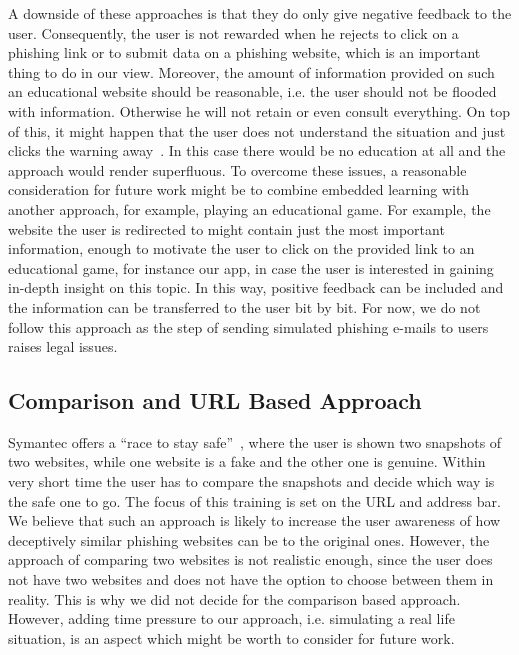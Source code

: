 A downside of these approaches is that they do only give negative feedback to the user. 
Consequently, the user is not rewarded when he rejects to click on a phishing link or to submit data on a phishing website, which is an important thing to do in our view. 
Moreover, the amount of information provided on such an educational website should be reasonable, i.e. the user should not be flooded with information. 
Otherwise he will not retain or even consult everything. 
On top of this, it might happen that the user does not understand the situation and just clicks the warning away~\cite{TUD-CS-2013-0167}.
In this case there would be no education at all and the approach would render superfluous.
To overcome these issues, a reasonable consideration for future work might be to combine embedded learning with another approach, for example, playing an educational game. 
For example, the website the user is redirected to might contain just the most important information, enough to motivate the user to click on the provided link to an educational game, for instance our app, in case the user is interested in gaining in-depth insight on this topic. 
In this way, positive feedback can be included and the information can be transferred to the user bit by bit. 
For now, we do not follow this approach as the step of sending simulated phishing e-mails to users raises legal issues.
\subsection{Comparison and URL Based Approach}
Symantec offers a ``race to stay safe''~\cite{staysafeonline}, where the user is shown two snapshots of two websites, while one website is a fake and the other one is genuine. 
Within very short time the user has to compare the snapshots and decide which way is the safe one to go. 
The focus of this training is set on the URL and address bar. 
We believe that such an approach is likely to increase the user awareness of how deceptively similar phishing websites can be to the original ones. 
However, the approach of comparing two websites is not realistic enough, since the user does not have two websites and does not have the option to choose between them in reality. 
This is why we did not decide for the comparison based approach. 
However, adding time pressure to our approach, i.e. simulating a real life situation, is an aspect which might be worth to consider for future work.

